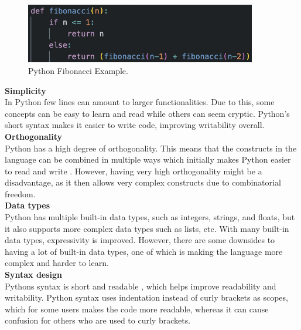 \begin{figure}[H] 
    \begin{center}
        \includegraphics[width=0.9\textwidth]{Files/Billeder: Analyse/PythonFiboExample.png}
    \end{center}
    \caption{Python Fibonacci Example.}
    \label{codeEx:Python}
\end{figure}

\noindent\textbf{Simplicity}\\
\noindent In Python few lines can amount to larger functionalities. Due to this, some concepts can be easy to learn and read while others can seem cryptic. Python's short syntax makes it easier to write code, improving writability overall.\\

\noindent\textbf{Orthogonality}\\
\noindent Python has a high degree of orthogonality. This means that the constructs in the language can be combined in multiple ways which initially makes Python easier to read and write \cite{progEvalArticle}. However, having very high orthogonality might be a disadvantage, as it then allows very complex constructs due to combinatorial freedom.
\\

\noindent\textbf{Data types}\\
\noindent Python has multiple built-in data types, such as integers, strings, and floats, but it also supports more complex data types such as lists, etc. With many built-in data types, expressivity is improved. However, there are some downsides to having a lot of built-in data types, one of which is making the language more complex and harder to learn.\\

\noindent\textbf{Syntax design}\\
\noindent Pythons syntax is short and readable \cite{PyntaxSyntax}, which helps improve readability and writability. Python syntax uses indentation instead of curly brackets as scopes, which for some users makes the code more readable, whereas it can cause confusion for others who are used to curly brackets.\\

